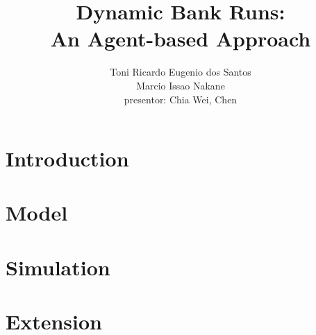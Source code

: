 \documentclass[]{beamer}
\title{Dynamic Bank Runs: \\ An Agent-based Approach}
\author{Toni Ricardo Eugenio dos Santos \\ [1em]
Marcio Issao Nakane \\[3em]
\small presentor: Chia Wei, Chen
}
\begin{document}
    \begin{frame}
        \maketitle
    \end{frame}

    \section{Introduction}
    

    \section{Model}
    

    \section{Simulation}
    
    
    \section{Extension}
    
\end{document}
